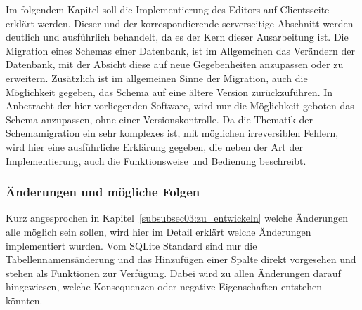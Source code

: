 Im folgendem Kapitel soll die Implementierung des Editors auf Clientsseite erklärt werden. Dieser und der korrespondierende serverseitige Abschnitt werden deutlich und ausführlich behandelt, da es der Kern dieser Ausarbeitung ist.
Die Migration eines Schemas einer Datenbank, ist im Allgemeinen das Verändern der Datenbank, mit der Absicht diese auf neue Gegebenheiten anzupassen oder zu erweitern. Zusätzlich ist im allgemeinen Sinne der Migration, auch die Möglichkeit gegeben, das Schema auf eine ältere Version zurückzuführen.
In Anbetracht der hier vorliegenden Software, wird nur die Möglichkeit geboten das Schema anzupassen, ohne einer Versionskontrolle.
Da die Thematik der Schemamigration ein sehr komplexes ist, mit möglichen ir­re­ver­si­blen Fehlern, wird hier eine ausführliche Erklärung gegeben, die neben der Art der Implementierung, auch die Funktionsweise und Bedienung beschreibt.

\subsubsection{Änderungen und mögliche Folgen}
\label{subsubsec04:editor_moegliche_aenderungen}
Kurz angesprochen in Kapitel~\ref{subsubsec03:zu_entwickeln} welche Änderungen alle möglich sein sollen, wird hier im Detail erklärt welche Änderungen implementiert wurden. Vom SQLite Standard sind nur die Tabellennamensänderung und das Hinzufügen einer Spalte direkt vorgesehen und stehen als Funktionen zur Verfügung. Dabei wird zu allen Änderungen darauf hingewiesen, welche Konsequenzen oder negative Eigenschaften entstehen könnten.

